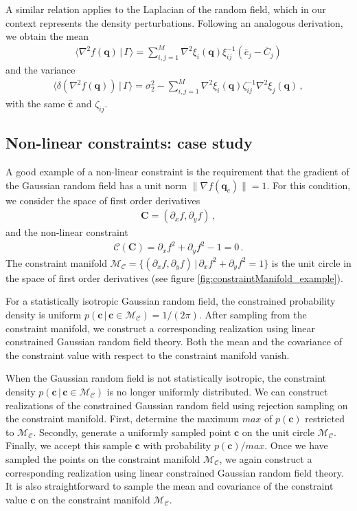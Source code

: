 \documentclass[a4paper, 11pt]{article}
\begin{document}
A similar relation applies to the Laplacian of the random field, which in our context represents the density perturbations. Following an analogous derivation, we obtain the mean
\begin{align}
\langle \nabla^2 f(\bm{q})\,|\,\Gamma\rangle = \sum_{i,j=1}^M \nabla^2\xi_i(\bm{q})\xi_{ij}^{-1}(\bar{c}_j-\bar{C}_j)
\end{align}
and the variance
\begin{align}
\langle \delta (\nabla^2 f(\bm{q}))\,|\,\Gamma\rangle = \sigma_2^2 - \sum_{i,j=1}^M \nabla^2 \xi_i(\bm{q})\zeta_{ij}^{-1}\nabla^2\xi_j(\bm{q})\,,
\end{align}
with the same $\bar{\bm{c}}$ and $\zeta_{ij}$.



\subsection{Non-linear constraints: case study}
A good example of a non-linear constraint is the requirement that the gradient of the Gaussian random field has a unit norm $\|\nabla f(\bm{q}_c)\|=1$. For this condition, we consider the space of first order derivatives
\begin{align}
\bm{C}=(\partial_x f, \partial_y f)\,,
\end{align}
and the non-linear constraint 
\begin{align}
\mathcal{C}(\bm{C})=\partial_x f^2 +  \partial_y f^2 - 1=0\,.
\end{align}
The constraint manifold $\mathcal{M}_\mathcal{C}=\{(\partial_xf,\partial_yf)\, |\, \partial_xf^2+\partial_yf^2=1\}$ is the unit circle in the space of first order derivatives (see figure \ref{fig:constraintManifold_example}).

For a statistically isotropic Gaussian random field, the constrained probability density is uniform $p(\bm{c}\, |\, \bm{c}\in\mathcal{M}_\mathcal{C}) = 1/(2\pi)$. After sampling from the constraint manifold, we construct a corresponding realization using linear constrained Gaussian random field theory. Both the mean and the covariance of the constraint value with respect to the constraint manifold vanish.

When the Gaussian random field is not statistically isotropic, the constraint density $p(\bm{c}\, |\, \bm{c}\in\mathcal{M}_\mathcal{C})$ is no longer uniformly distributed. We can construct realizations of the constrained Gaussian random field using rejection sampling on the constraint manifold. First, determine the maximum $max$ of $p(\bm{c})$ restricted to $\mathcal{M}_\mathcal{C}$. Secondly, generate a uniformly sampled point $\bm{c}$ on the unit circle $\mathcal{M}_\mathcal{C}$. Finally, we accept this sample $\bm{c}$ with probability $p(\bm{c})/max$. Once we have sampled the points on the constraint manifold $\mathcal{M}_\mathcal{C}$, we again construct a corresponding realization using linear constrained Gaussian random field theory. It is also straightforward to sample the mean and covariance of the constraint value $\bm{c}$ on the constraint manifold $\mathcal{M}_\mathcal{C}$.
\end{document}
